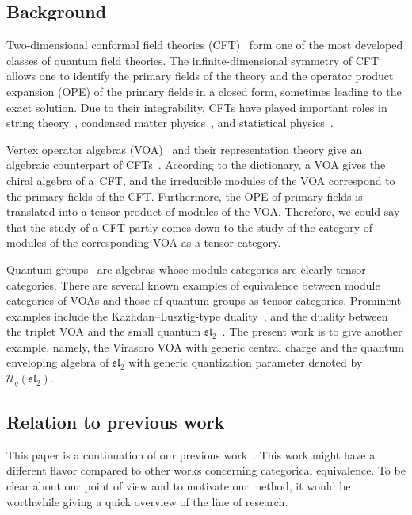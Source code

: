 \documentclass[pdftex]{sigma}
\numberwithin{equation}{section}
\newcommand{\cU}{\mathcal{U}}
\newcommand{\fsl}{\mathfrak{sl}}
\newcommand{\UEA}{\cU}
\newcommand{\Uq}{\UEA_{q}}
\begin{document}
\subsection{Background}
Two-dimensional conformal field theories (CFT)~\cite{BPZ1984b,DMS_yellow_CFT} form one of the most developed classes of quantum field theories.
The infinite-dimensional symmetry of CFT allows one to identify the primary fields of the theory and the operator product expansion (OPE) of the primary fields in a closed form, sometimes leading to the exact solution.
Due to their integrability, CFTs have played important roles in string theory~\cite{GreenSchwarzWitten_superstring}, condensed matter physics~\cite{Hansson_QHall_CFT,Ludwig_CFT_condensed_matter}, and statistical physics~\cite{Cardy_lecture_2008,Mussardo-statistical_field_theory}.

Vertex operator algebras (VOA)~\cite{FLM-VOAs_Monster,Lepowsky_Li-VOA} and their representation theory give an algebraic counterpart of CFTs~\cite{Huang-CFT_and_VOA}.
According to the dictionary, a VOA gives the chiral algebra of a~CFT, and the irreducible modules of the VOA correspond to the primary fields of the CFT.
Furthermore, the OPE of primary fields is translated into a tensor product of modules of the VOA.
Therefore, we could say that the study of a CFT partly comes down to the study of the category of modules of the corresponding VOA as a tensor category.

Quantum groups~\cite{Drinfeld1986} are algebras whose module categories are clearly tensor categories.
There are several known examples of equivalence between module categories of VOAs and those of quantum groups as tensor categories.
Prominent examples include the Kazhdan--Lusztig-type duality~\cite{Drinfeld1989,Finkelberg1996,KL-tensor_structures_affine_Lie-I,KL-tensor_structures_affine_Lie-II,KL-tensor_structures_affine_Lie-III,KL-tensor_structures_affine_Lie-IV,McRae-nonneg_integer_level_affine_Lie_algebra_tensor_cat}, and the duality between the triplet VOA and the small quantum $\fsl_{2}$~\cite{CreutzigLentnerRupert,FeiginGainutdinovSemikhatovTipunin2006a,FeiginGainutdinovSemikhatovTipunin2006b,GannonNegron-quantum_sltwo_and_log_VOAs,KondoSaito2011, NagatomoTsuchiya2011,TsuchiyaWood2013}.
The present work is to give another example, namely, the Virasoro VOA with generic central charge and the quantum enveloping algebra of $\fsl_{2}$ with generic quantization parameter denoted by $\Uq(\fsl_{2})$.

\subsection{Relation to previous work}
This paper is a continuation of our previous work~\cite{KoshidaKytola2022}.
This work might have a different flavor compared to other works concerning categorical equivalence.
To be clear about our point of view and to motivate our method,
it would be worthwhile giving a quick overview of the line of research.
\end{document}

